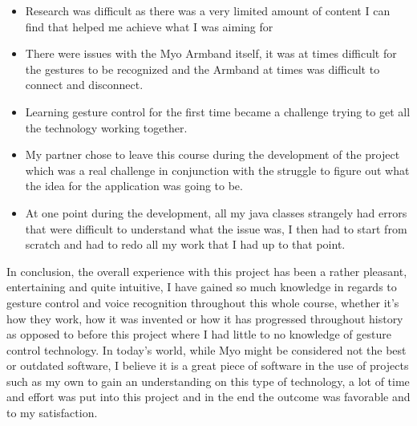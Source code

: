 \documentclass{article}
\begin{document}
\begin{itemize}
    \item Research was difficult as there was a very limited amount of content I can find that helped me achieve what I was aiming for
    \item There were issues with the Myo Armband itself, it was at times difficult for the gestures to be recognized and the Armband at times was difficult to connect and disconnect.
    \item Learning gesture control for the first time became a challenge trying to get all the technology working together.
    \item My partner chose to leave this course during the development of the project which was a real challenge in conjunction with the struggle to figure out what the idea for the application was going to be.
    \item At one point during the development, all my java classes strangely had errors that were difficult to understand what the issue was, I then had to start from scratch and had to redo all my work that I had up to that point.
\end{itemize}
In conclusion, the overall experience with this project has been a rather pleasant, entertaining and quite intuitive, I have gained so much knowledge in regards to gesture control and voice recognition throughout this whole course, whether it's how they work, how it was invented or how it has progressed throughout history as opposed to before this project where I had little to no knowledge of gesture control technology. In today's world, while Myo might be considered not the best or outdated software, I believe it is a great piece of software in the use of projects such as my own to gain an understanding on this type of technology, a lot of time and effort was put into this project and in the end the outcome was favorable and to my satisfaction.
\end{document}
